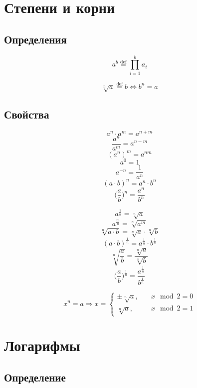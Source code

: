 \documentclass[
  letterpaper,
  DIV=11,
  numbers=noendperiod]{scrreprt}
\newcommand{\artanh}{\text{artanh}}
\newcommand{\median}{\mathrm{median}}
\newcommand{\mean}{\mathbb{M}}
\newcommand{\skew}{\mathrm{skew}}
\newcommand{\kurt}{\mathrm{kurt}}
\theoremstyle{definition}
\theoremstyle{remark}
\begin{document}
\usepackage{amsmath}
\DeclareMathOperator\artanh{artanh}

\newcommand{\median}{\text{median}}
\newcommand{\mean}{\mathbb{M}}
\newcommand{\skew}{\mathrm{skew}}
\newcommand{\kurt}{\mathrm{kurt}}

\section{Степени и корни}\label{formulas_power}

\subsection{Определения}\label{formulas_power_def}

\[
a^b \overset{\text{def}}{=}\prod_{i=1}^b a_i
\]

\[
\sqrt[n]a \overset{\text{def}}{=}b \Leftrightarrow b^n = a
\]

\subsection{Свойства}\label{formulas_power_identities}

\[a^n \cdot a^m = a^{n+m}\] \[\frac{a^n}{a^m} = a^{n-m}\]
\[(a^n)^m = a^{nm}\] \[a^0 = 1\] \[a^{-n}=\frac{1}{a^n}\]
\[(a \cdot b)^n = a^n \cdot b^n\]
\[\Big(\frac{a}{b}\Big)^n = \frac{a^n}{b^n}\]

\[a^{\frac{1}{n}}=\sqrt[n]{a}\] \[a^{\frac{m}{n}}=\sqrt[n]{a^m}\]
\[\sqrt[n]{a \cdot b} = \sqrt[n]{a} \cdot \sqrt[n]{b}\]
\[(a \cdot b)^{\frac{1}{n}} = a^{\frac{1}{n}} \cdot b^{\frac{1}{n}}\]
\[\sqrt[n]{\frac{a}{b}} = \frac{\sqrt[n]{a}}{\sqrt[n]{b}}\]
\[\Big(\frac{a}{b}\Big)^{\frac{1}{n}} = \frac{a^{\frac{1}{n}}}{b^{\frac{1}{n}}}\]

\[
x^n = a \Rightarrow x = 
\begin{cases}
\pm \sqrt[n]{a}, &\quad x \mod 2 = 0 \\ 
\sqrt[n]{a}, &\quad x \mod 2 = 1
\end{cases}
\]

\section{Логарифмы}\label{formulas_log}

\subsection{Определение}\label{formulas_log_def}
\end{document}
